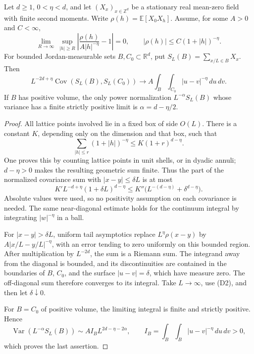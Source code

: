 \begin{proposition}\ours
Let \(d\ge1\), \(0<\eta<d\), and let \((X_x)_{x\in\mathbb Z^d}\) be a stationary real mean-zero field with finite second moments. Write
\(\rho(h)=\mathbb E[X_0X_h]\).
Assume, for some \(A>0\) and \(C<\infty\),
\[
 \lim_{R\to\infty}\ \sup_{|h|\ge R}
 \left|\frac{\rho(h)}{A|h|^{-\eta}}-1\right|=0,
 \qquad
 |\rho(h)|\le C(1+|h|)^{-\eta}.
\]
For bounded Jordan-measurable sets \(B,C_0\subset\mathbb R^d\), put
\(S_L(B)=\sum_{x/L\in B}X_x\).
Then
\[
 L^{-2d+\eta}\operatorname{Cov}(S_L(B),S_L(C_0))
 \longrightarrow A\int_B\int_{C_0}|u-v|^{-\eta}\,du\,dv.
 \tag{D1}
\]
If \(B\) has positive volume, the only power normalization \(L^{-\alpha}S_L(B)\) whose variance has a finite strictly positive limit is
\(\alpha=d-\eta/2\).
\end{proposition}
\begin{proof}
All lattice points involved lie in a fixed box of side \(O(L)\). There is a constant \(K\), depending only on the dimension and that box, such that
\[
 \sum_{|h|\le r}(1+|h|)^{-\eta}\le K(1+r)^{d-\eta}.
\]
One proves this by counting lattice points in unit shells, or in dyadic annuli; \(d-\eta>0\) makes the resulting geometric sum finite. Thus the part of the normalized covariance sum with \(|x-y|\le\delta L\) is at most
\[
 K' L^{-d+\eta}(1+\delta L)^{d-\eta}
 \le K''\bigl(L^{-(d-\eta)}+\delta^{d-\eta}\bigr).
 \tag{D2}
\]
Absolute values were used, so no positivity assumption on each covariance is needed. The same near-diagonal estimate holds for the continuum integral by integrating \(|w|^{-\eta}\) in a ball.

For \(|x-y|>\delta L\), uniform tail asymptotics replace \(L^\eta\rho(x-y)\) by
\(A|x/L-y/L|^{-\eta}\), with an error tending to zero uniformly on this bounded region. After multiplication by \(L^{-2d}\), the sum is a Riemann sum. The integrand away from the diagonal is bounded, and its discontinuities are contained in the boundaries of \(B\), \(C_0\), and the surface \(|u-v|=\delta\), which have measure zero. The off-diagonal sum therefore converges to its integral. Take \(L\to\infty\), use (D2), and then let \(\delta\downarrow0\).

For \(B=C_0\) of positive volume, the limiting integral is finite and strictly positive. Hence
\[
 \operatorname{Var}(L^{-\alpha}S_L(B))
 \sim A I_B L^{2d-\eta-2\alpha},
 \qquad I_B=\int_B\int_B|u-v|^{-\eta}\,du\,dv>0,
\]
which proves the last assertion.
\end{proof}

